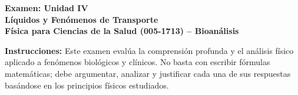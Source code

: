 \documentclass[10pt,letterpaper]{article}
\begin{document}
\footnotesize

\begin{center}
    \textbf{\Large Examen: Unidad IV}\\
    \textbf{\large Líquidos y Fenómenos de Transporte}\\
    \vspace{0.1cm}
    \textbf{Física para Ciencias de la Salud (005-1713) -- Bioanálisis}\\
\end{center}

\vspace{0.1cm}

\textbf{Instrucciones:} Este examen evalúa la comprensión profunda y el análisis físico aplicado a fenómenos biológicos y clínicos. No basta con escribir fórmulas matemáticas; debe argumentar, analizar y justificar cada una de sus respuestas basándose en los principios físicos estudiados.

\vspace{0.1cm}
\end{document}
